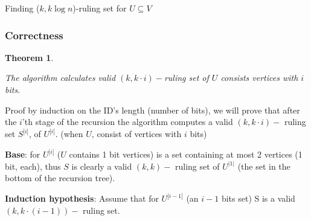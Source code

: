 \documentclass[11pt]{article}
\newtheorem{theorem}{Theorem}[section]
\begin{document}
\begin{algorithm}
  \caption{Finding ($k, k\log{n}$)-ruling set for $U \subseteq V$}
  \begin{algorithmic}[1]
    \Statex
         
            \State {}
        \EndIf
        
         
      
         

        
        \State {}
    \EndFunction
  \end{algorithmic}
\end{algorithm}


\subsubsection*{Correctness}

\begin{theorem}
\label{rulling_set_i}

The algorithm calculates valid $(k, k \cdot i)-$ruling set of $U$ consists vertices with $i$ bits.
\end{theorem}
Proof by induction on the ID's length (number of bits), we will prove that after the $i$'th stage of the recursion the algorithm computes a valid $(k, k \cdot i)-$ ruling set $S^{|i|}$, of $U^{|i|}$. (when $U$, consist of vertices with $i$ bits)

\textbf{Base}: for $U^{|i|}$ ($U$ contains 1 bit vertices) is a set containing at most 2 vertices (1 bit, each), thus $S$ is clearly a valid $(k, k)-$ ruling set of $U^{|1|}$ (the set in the bottom of the recursion tree).


\textbf{Induction hypothesis}: Assume that for $U^{|i-1|}$ (an $i-1$ bits set) S is a valid $(k, k \cdot (i-1))-$ ruling set. 
\end{document}
